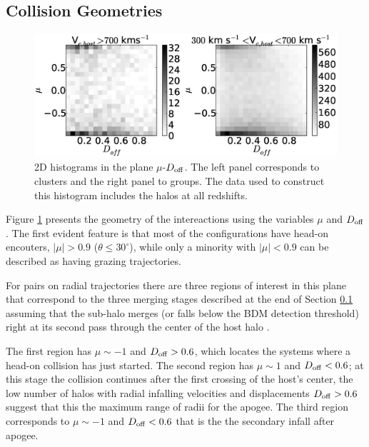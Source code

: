 \documentclass{emulateapj}
\begin{document}
\subsection{Collision Geometries}
\label{sec:geometry}

\begin{figure}
\begin{center}
\includegraphics[width=1.0\textwidth]{figure_2.eps}
\end{center}
\caption{2D histograms in the plane $\mu$-$D_{\rm off}$. The left
  panel corresponds to clusters and the right panel to groups. The data
  used to construct this histogram includes the halos at all redshifts.}
\label{fig:geometry}
\end{figure}

Figure \ref{fig:geometry} presents the geometry of the intereactions using the 
variables $\mu$ and $D_{\rm off}$. The first evident feature is that
most of the configurations have head-on encouters, $|\mu|>0.9$
($\theta\leq 30^{\circ}$), while only a minority with $|\mu|<0.9$ can
be described as having  grazing trajectories. 

For pairs on radial trajectories there are three regions of interest
in this plane that correspond to the three merging stages described
at the end of Section \ref{sec:geometry} assuming that the sub-halo
merges (or falls below the BDM detection threshold) right at its
second pass through the center of the host halo \citep{Poole2006}.  

The first region has $\mu\sim-1$ and $D_{\rm off}>0.6$, which
locates the systems where a head-on collision has just started. The
second region has $\mu\sim 1$ and $D_{\rm off}<0.6$; at this stage
the collision continues after the first crossing of the host's center,
the low number of halos with radial infalling velocities and
displacements $D_{\rm off}>0.6$ suggest that this the maximum range of
radii for the apogee.  The third region corresponds to $\mu\sim-1$
and $D_{\rm off}<0.6$ that is the the secondary infall after apogee.  
\end{document}
